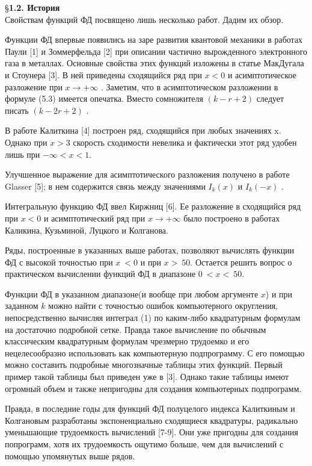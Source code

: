 \S \textbf{1.2. История}
\\

Свойствам функций ФД посвящено лишь несколько работ. Дадим их обзор.

Функции ФД впервые появились на заре развития квантовой механики в работах Паули [1] и Зоммерфельда [2] при описании частично вырожденного электронного газа в металлах. Основные свойства этих функций изложены в статье МакДугала и Стоунера [3]. В ней приведены сходящийся ряд при $x < 0$ и
асимптотическое разложение при $x \to +\infty$ . Заметим, что в асимптотическом разложении в формуле (5.3) имеется опечатка. Вместо сомножителя $(k - r + 2)$ следует писать $(k - 2r + 2)$ .

В работе Калиткина [4] построен ряд, сходящийся при любых значениях x. Однако при $x > 3$ скорость сходимости невелика и фактически этот ряд удобен лишь при $-\infty < x < 1$.

Улучшенное выражение для асимптотического разложения получено в работе Glasser [5]; в нем содержится связь между значениями  $I_k(x)$ и $I_k(-x)$ .

Интегральную функцию ФД ввел Киржниц [6]. Ее разложение в сходящийся ряд при $x < 0$  и асимптотический ряд при $x \to +\infty$ было построено в работах Каликина, Кузьминой, Луцкого и Колганова.

Ряды, построенные в указанных выше работах, позволяют вычислять функции ФД с высокой точностью при $x ~< 0$ и при $x >~ 50$. Остается решить вопрос о практическом вычислении функций ФД в диапазоне $0 ~<x <~ 50$.

Функции ФД в указанном диапазоне(и вообще при любом аргументе $x$) и при заданном $k$ можно найти с
точностью ошибок компьютерного округления, непосредственно вычисляя
интеграл (1) по каким-либо квадратурным формулам на достаточно
подробной сетке. Правда такое вычисление по обычным классическим квадратурным формулам чрезмерно трудоемко и его нецелесообразно использовать как компьютерную подпрограмму. С его помощью можно составить подробные многозначные таблицы этих функций. Первый пример такой таблицы был приведен уже в [3]. Однако такие таблицы имеют огромный объем и также
непригодны для создания компьютерных
подпрограмм.

Правда, в последние годы для функций ФД полуцелого индекса Калиткиным и Колгановым разработаны экспоненциально сходящиеся квадратуры, радикально уменьшающие трудоемкость вычислений [7-9]. Они уже пригодны для создания попрограмм, хотя их трудоемкость ощутимо больше, чем для вычислений с помощью упомянутых выше рядов.

